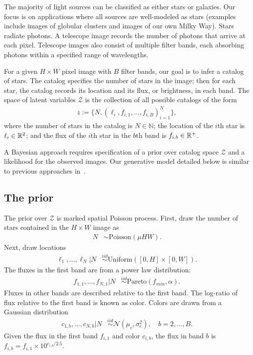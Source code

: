 The majority of light sources can be classified as either stars or galaxies. Our focus is on applications where all sources are well-modeled as stars (examples include images of globular clusters and images of our own Milky Way). 
Stars radiate photons. 
A telescope image records the number of photons that arrive at each pixel. Telescope images also consist of multiple filter bands, each absorbing photons within a specified range of wavelengths. 

For a given $H \times W$ pixel image with $B$ filter bands, our goal is to infer a catalog of 
stars. 
The catalog specifies the number of stars 
in the image; then for each star, the catalog 
records its location and its flux, or brightness,
in each band. 
The space of latent variables 
$\mathcal{Z}$ is the collection of all possible catalogs of the form
\begin{align}
    z := \{N, (\ell_i, f_{i,1}, ..., f_{i,B})_{i = 1}^N\},
    \label{eq:cat_formulation}
\end{align}
where the number of stars in the catalog
is $N\in\mathbb{N}$;
the location of the $i$th star is $\ell_i \in \mathbb{R}^2$; and 
the flux of the $i$th star in the $b$th band is $f_{i, b}\in\mathbb{R}^+$. 

A Bayesian approach requires specification of a prior over catalog space $\mathcal{Z}$ and a likelihood for the observed images. Our generative model detailed below is similar to previous approaches in~\cite{Brewer_2013, Portillo_2017, Feder_2019, regier2019_celeste}. 

\subsection{The prior}
The prior over $\mathcal{Z}$ is marked spatial Poisson process. First, draw the number of stars contained in the $H\times W$ image as
\begin{align}
	N &\sim \text{Poisson}(\mu HW).
	\label{eq:n_prior}
\end{align}
Next, draw locations
\begin{align}
  \ell_1, ..., \ell_N | N &\stackrel{iid}{\sim} \text{Uniform}([0, H] \times [0, W]). 
 \end{align}
The fluxes in the first band are from a power law distribution:
\begin{align}
    f_{1, 1}, ..., f_{N,1} | N & 
    \stackrel{iid}{\sim} \text{Pareto}(f_{min}, \alpha) 
    \label{eq:flux_prior}.
\end{align}
Fluxes in other bands are described relative to the first band. The log-ratio of flux relative to the first band is
known as color. Colors are drawn from a Gaussian distribution
\begin{align}
  c_{1, b}, ..., c_{N,b} | N  & 
      \stackrel{iid}{\sim} \mathcal{N}(\mu_c, \sigma^2_c), \quad b = 2, ..., B.
\end{align}
Given the flux in the first band $f_{i,1}$ and color $c_{i,b}$,
the flux in band $b$ is  $f_{i,b} = f_{i,1} \times 10^{c_{i,b} / 2.5}$.

